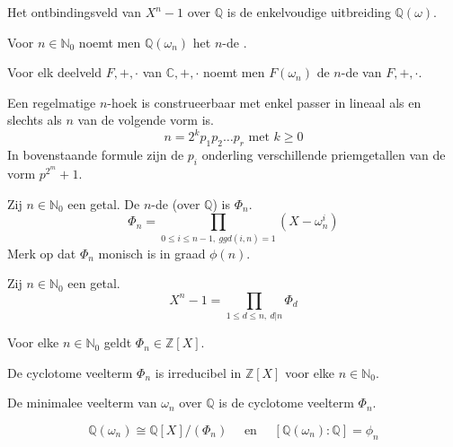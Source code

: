 \documentclass[main.tex]{subfiles}
\begin{document}
\begin{st}
  Het ontbindingsveld van $X^{n}-1$ over $\mathbb{Q}$ is de enkelvoudige uitbreiding $\mathbb{Q}(\omega)$.
\end{st}

\begin{de}
  Voor $n\in \mathbb{N}_{0}$ noemt men $\mathbb{Q}(\omega_{n})$ het $n$-de .
\end{de}

\begin{de}
  Voor elk deelveld $F,+,\cdot$ van $\mathbb{C},+,\cdot$ noemt men $F(\omega_{n})$ de $n$-de  van $F,+,\cdot$.
\end{de}

\begin{st}
  Een regelmatige $n$-hoek is construeerbaar met enkel passer in lineaal als en slechts als $n$ van de volgende vorm is.
  \[ n = 2^{k}p_{1}p_{2}\dotsc p_{r} \text{ met } k\ge 0 \]
  In bovenstaande formule zijn de $p_{i}$ onderling verschillende priemgetallen van de vorm $p^{2^{m}} +1$.
  \zb
\end{st}

\begin{de}
  Zij $n\in \mathbb{N}_{0}$ een getal.
  De $n$-de  (over $\mathbb{Q}$) is $\Phi_{n}$.
  \[ \Phi_{n} = \prod_{0\le i \le n-1,\ ggd(i,n)= 1}(X-\omega_{n}^{i})\]
  Merk op dat $\Phi_{n}$ monisch is in graad $\phi(n)$.
\end{de}

\begin{ei}
  Zij $n\in \mathbb{N}_{0}$ een getal.
  \[ X^{n}-1 = \prod_{1\le d\le n,\ d|n}\Phi_{d} \]
\end{ei}

\begin{pr}
  Voor elke $n\in \mathbb{N}_{0}$ geldt $\Phi_{n} \in \mathbb{Z}[X]$.
\end{pr}

\begin{st}
  De cyclotome veelterm $\Phi_{n}$ is irreducibel in $\mathbb{Z}[X]$ voor elke $n\in \mathbb{N}_{0}$.
  \zb
\end{st}

\begin{gev}
  De minimalee veelterm van $\omega_{n}$ over $\mathbb{Q}$ is de cyclotome veelterm $\Phi_{n}$.
\end{gev}

\begin{gev}
  \[ \mathbb{Q}(\omega_{n}) \cong \mathbb{Q}[X]/(\Phi_{n}) \quad\text{ en }\quad [\mathbb{Q}(\omega_{n}):\mathbb{Q}] = \phi_{n} \]
\end{gev}
\end{document}
